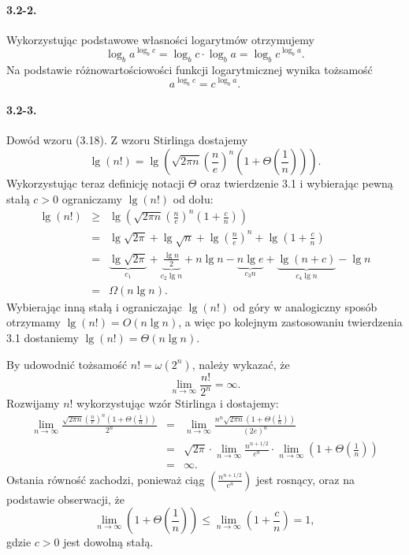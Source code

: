 \paragraph{3.2-2.}
Wykorzystując podstawowe własności logarytmów otrzymujemy
\[
  \log_ba^{\log_bc} = \log_bc\cdot\log_ba = \log_bc^{\log_ba}.
\]
Na podstawie różnowartościowości funkcji logarytmicznej wynika tożsamość
\[
  a^{\log_bc}=c^{\log_ba}.
\]

\paragraph{3.2-3.}
Dowód wzoru (3.18). Z wzoru Stirlinga dostajemy
\[
  \lg(n!) = \lg\left(\sqrt{2\pi n}\left(\frac{n}{e}\right)^n\left(1+\Theta\left(\frac{1}{n}\right)\right)\right).
\]
Wykorzystując teraz definicję notacji $\Theta$ oraz twierdzenie 3.1 i wybierając pewną stałą $c>0$ ograniczamy $\lg(n!)$ od dołu:
\begin{eqnarray*}
  \lg(n!) &\ge& \lg\left(\sqrt{2\pi n}\left(\frac{n}{e}\right)^n\left(1+\frac{c}{n}\right)\right) \\
  &=& \lg\sqrt{2\pi} + \lg\sqrt{n} + \lg\left(\frac{n}{e}\right)^n + \lg\left(1+\frac{c}{n}\right) \\
  &=& \underbrace{\lg\sqrt{2\pi}}_{c_1} + \underbrace{\frac{\lg n}{2}}_{c_2\lg n} + n\lg n - \underbrace{n\lg e}_{c_3n} + \underbrace{\lg(n+c)}_{c_4\lg n} - \lg n \\
  &=& \Omega(n\lg n).
\end{eqnarray*}
Wybierając inną stałą i ograniczając $\lg(n!)$ od góry w analogiczny sposób otrzymamy $\lg(n!)=O(n\lg n)$, a więc po kolejnym zastosowaniu twierdzenia 3.1 dostaniemy $\lg(n!)=\Theta(n\lg n)$.

By udowodnić tożsamość $n!=\omega(2^n)$, należy wykazać, że
\[
  \lim_{n\to\infty}\frac{n!}{2^n}=\infty.
\]
Rozwijamy $n!$ wykorzystując wzór Stirlinga i dostajemy:
\begin{eqnarray*}
  \lim_{n\to\infty}\frac{\sqrt{2\pi n}\left(\frac{n}{e}\right)^n\left(1+\Theta\left(\frac{1}{n}\right)\right)}{2^n} &=& \lim_{n\to\infty}\frac{n^n\sqrt{2\pi n}\left(1+\Theta\left(\frac{1}{n}\right)\right)}{(2e)^n} \\
  &=& \sqrt{2\pi}\cdot\lim_{n\to\infty}\frac{n^{n+1/2}}{e^n}\cdot\lim_{n\to\infty}\left(1+\Theta\left(\frac{1}{n}\right)\right) \\
  &=& \infty.
\end{eqnarray*}
Ostania równość zachodzi, ponieważ ciąg $\left(\frac{n^{n+1/2}}{e^n}\right)$ jest rosnący, oraz na podstawie obserwacji, że
\begin{equation}\label{eq-3.2-3}
  \lim_{n\to\infty}\left(1+\Theta\left(\frac{1}{n}\right)\right)\le \lim_{n\to\infty}\left(1+\frac{c}{n}\right)=1,
\end{equation}
gdzie $c>0$ jest dowolną stałą.

